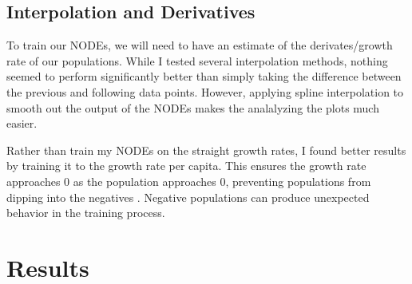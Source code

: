 \documentclass{article}
\begin{document}
\subsection{Interpolation and Derivatives}
To train our NODEs, we will need to have an estimate of the derivates/growth rate of our populations. While I tested several interpolation methods, nothing seemed to perform significantly better than simply taking the difference between the previous and following data points. However, applying spline interpolation to smooth out the output of the NODEs makes the analalyzing the plots much easier.

Rather than train my NODEs on the straight growth rates, I found better results by training it to the growth rate per capita. This ensures the growth rate approaches $0$ as the population approaches $0$, preventing populations from dipping into the negatives \cite{primarypaper}. Negative populations can produce unexpected behavior in the training process.

\section{Results}
\end{document}
